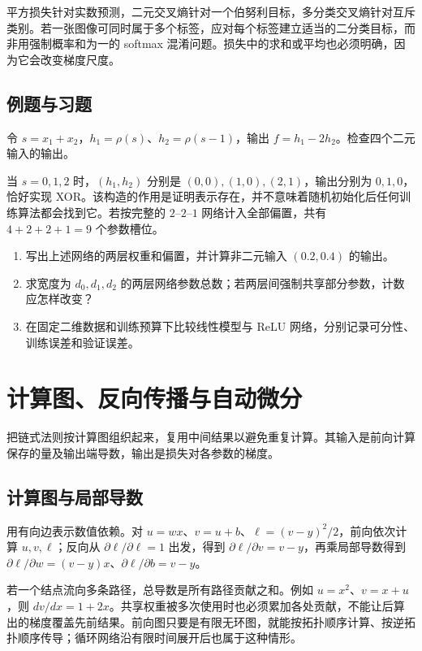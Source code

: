 \documentclass[UTF8,12pt,a4paper,fontset=fandol]{ctexbook}
\begin{document}
平方损失针对实数预测，二元交叉熵针对一个伯努利目标，多分类交叉熵针对互斥类别。若一张图像可同时属于多个标签，应对每个标签建立适当的二分类目标，而非用强制概率和为一的 softmax 混淆问题。损失中的求和或平均也必须明确，因为它会改变梯度尺度。

\section{例题与习题}
\begin{example}
令 $s=x_1+x_2$，$h_1=\rho(s)$、$h_2=\rho(s-1)$，输出 $f=h_1-2h_2$。检查四个二元输入的输出。
\end{example}
\begin{solve}
当 $s=0,1,2$ 时，$(h_1,h_2)$ 分别是 $(0,0),(1,0),(2,1)$，输出分别为 $0,1,0$，恰好实现 XOR。该构造的作用是证明表示存在，并不意味着随机初始化后任何训练算法都会找到它。若按完整的 $2$--$2$--$1$ 网络计入全部偏置，共有 $4+2+2+1=9$ 个参数槽位。
\end{solve}
\begin{enumerate}
\item 写出上述网络的两层权重和偏置，并计算非二元输入 $(0.2,0.4)$ 的输出。
\item 求宽度为 $d_0,d_1,d_2$ 的两层网络参数总数；若两层间强制共享部分参数，计数应怎样改变？
\item 在固定二维数据和训练预算下比较线性模型与 ReLU 网络，分别记录可分性、训练误差和验证误差。
\end{enumerate}

\chapter{计算图、反向传播与自动微分}
\label{chap:dl-backprop}
把链式法则按计算图组织起来，复用中间结果以避免重复计算。其输入是前向计算保存的量及输出端导数，输出是损失对各参数的梯度。

\section{计算图与局部导数}
用有向边表示数值依赖。对 $u=wx$、$v=u+b$、$\ell=(v-y)^2/2$，前向依次计算 $u,v,\ell$；反向从 $\partial\ell/\partial\ell=1$ 出发，得到 $\partial\ell/\partial v=v-y$，再乘局部导数得到 $\partial\ell/\partial w=(v-y)x$、$\partial\ell/\partial b=v-y$。

若一个结点流向多条路径，总导数是所有路径贡献之和。例如 $u=x^2$、$v=x+u$，则 $dv/dx=1+2x$。共享权重被多次使用时也必须累加各处贡献，不能让后算出的梯度覆盖先前结果。前向图只要是有限无环图，就能按拓扑顺序计算、按逆拓扑顺序传导；循环网络沿有限时间展开后也属于这种情形。
\end{document}
